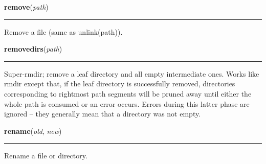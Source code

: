    \label{os:remove}

    \vspace{0.5ex}

\hspace{.8\funcindent}\begin{boxedminipage}{\funcwidth}

    \raggedright \textbf{remove}(\textit{path})

    \vspace{-1.5ex}

    \rule{\textwidth}{0.5\fboxrule}
\setlength{\parskip}{2ex}
    Remove a file (same as unlink(path)).

\setlength{\parskip}{1ex}
    \end{boxedminipage}

    \label{os:removedirs}

    \vspace{0.5ex}

\hspace{.8\funcindent}\begin{boxedminipage}{\funcwidth}

    \raggedright \textbf{removedirs}(\textit{path})

    \vspace{-1.5ex}

    \rule{\textwidth}{0.5\fboxrule}
\setlength{\parskip}{2ex}
    Super-rmdir; remove a leaf directory and all empty intermediate ones.  
    Works like rmdir except that, if the leaf directory is successfully 
    removed, directories corresponding to rightmost path segments will be 
    pruned away until either the whole path is consumed or an error occurs.
    Errors during this latter phase are ignored -- they generally mean that
    a directory was not empty.

\setlength{\parskip}{1ex}
    \end{boxedminipage}

    \label{os:rename}

    \vspace{0.5ex}

\hspace{.8\funcindent}\begin{boxedminipage}{\funcwidth}

    \raggedright \textbf{rename}(\textit{old}, \textit{new})

    \vspace{-1.5ex}

    \rule{\textwidth}{0.5\fboxrule}
\setlength{\parskip}{2ex}
    Rename a file or directory.

\setlength{\parskip}{1ex}
    \end{boxedminipage}

